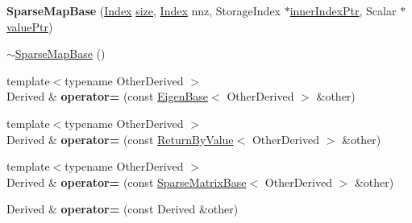 \begin{DoxyCompactItemize}
\item 
\mbox{\label{class_eigen_1_1_sparse_map_base_3_01_derived_00_01_write_accessors_01_4_a13d2e01e0bb556db1e6e8ebc0dcc9d13}} 
{\bfseries Sparse\+Map\+Base} (\mbox{\hyperlink{struct_eigen_1_1_eigen_base_a554f30542cc2316add4b1ea0a492ff02}{Index}} \mbox{\hyperlink{class_eigen_1_1_sparse_matrix_base_a124bc57921775eb9aa2dfd9727e23472}{size}}, \mbox{\hyperlink{struct_eigen_1_1_eigen_base_a554f30542cc2316add4b1ea0a492ff02}{Index}} nnz, Storage\+Index $\ast$\mbox{\hyperlink{class_eigen_1_1_sparse_map_base_3_01_derived_00_01_write_accessors_01_4_af5cd1f13dde8578eb9891a4ac4a11977}{inner\+Index\+Ptr}}, Scalar $\ast$\mbox{\hyperlink{class_eigen_1_1_sparse_map_base_3_01_derived_00_01_write_accessors_01_4_af91648a18729ae8ff29cb1d8751c5655}{value\+Ptr}})
\item 
\mbox{\hyperlink{class_eigen_1_1_sparse_map_base_3_01_derived_00_01_write_accessors_01_4_a4dfbcf3ac411885b1710ad04892c984d}{$\sim$\+Sparse\+Map\+Base}} ()
\item 
\mbox{\label{class_eigen_1_1_sparse_map_base_3_01_derived_00_01_write_accessors_01_4_a379e2a65ec661cceaddc225120ad5cb1}} 
{\footnotesize template$<$typename Other\+Derived $>$ }\\Derived \& {\bfseries operator=} (const \mbox{\hyperlink{struct_eigen_1_1_eigen_base}{Eigen\+Base}}$<$ Other\+Derived $>$ \&other)
\item 
\mbox{\label{class_eigen_1_1_sparse_map_base_3_01_derived_00_01_write_accessors_01_4_a3365b1d14b9f6c5d832169b3d07511a4}} 
{\footnotesize template$<$typename Other\+Derived $>$ }\\Derived \& {\bfseries operator=} (const \mbox{\hyperlink{class_eigen_1_1_return_by_value}{Return\+By\+Value}}$<$ Other\+Derived $>$ \&other)
\item 
\mbox{\label{class_eigen_1_1_sparse_map_base_3_01_derived_00_01_write_accessors_01_4_aa171e4de58f2bddb8da0358961c6d3fd}} 
{\footnotesize template$<$typename Other\+Derived $>$ }\\Derived \& {\bfseries operator=} (const \mbox{\hyperlink{class_eigen_1_1_sparse_matrix_base}{Sparse\+Matrix\+Base}}$<$ Other\+Derived $>$ \&other)
\item 
\mbox{\label{class_eigen_1_1_sparse_map_base_3_01_derived_00_01_write_accessors_01_4_af2eba8c3ea2424df618f3e90f1b5254b}} 
Derived \& {\bfseries operator=} (const Derived \&other)
\end{DoxyCompactItemize}
